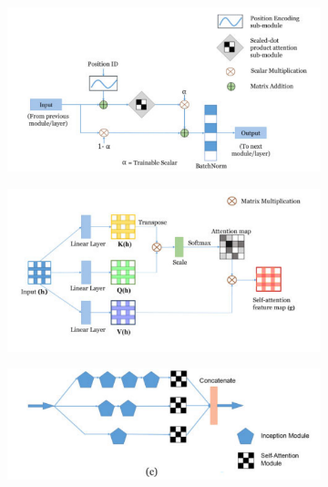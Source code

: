 \documentclass[8pt]{article}
\begin{document}
\begin{figure}[H]
     \centering
     \begin{subfigure}[b]{0.4\textwidth}
         \centering
         \includegraphics[width=\textwidth]{img1_1.png}
         \caption{}
         \label{fig:the self-attention module }
     \end{subfigure}
     \begin{subfigure}[b]{0.4\textwidth}
         \centering
         \includegraphics[width=\textwidth]{img1_2.png}
         \caption{}
         \label{fig:caled dot-product attention sub-module.}
     \end{subfigure}
     \begin{subfigure}[b]{0.4\textwidth}
         \centering
         \includegraphics[width=\textwidth]{img1_3.png}

\end{subfigure}
\end{figure}
\end{document}
